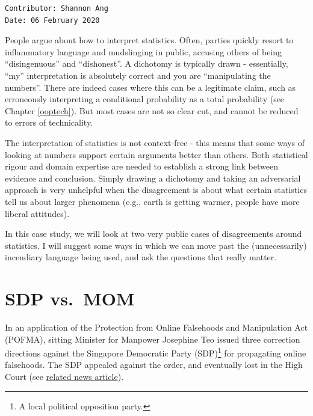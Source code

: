 \documentclass[
  openany]{book}
\begin{document}
\begin{verbatim}
Contributor: Shannon Ang
Date: 06 February 2020
\end{verbatim}

People argue about how to interpret statistics. Often, parties quickly resort to inflammatory language and mudslinging in public, accusing others of being ``disingenuous'' and ``dishonest''. A dichotomy is typically drawn - essentially, ``my'' interpretation is absolutely correct and you are ``manipulating the numbers''. There are indeed cases where this can be a legitimate claim, such as erroneously interpreting a conditional probability as a total probability (see Chapter \ref{ooptech}). But most cases are not so clear cut, and cannot be reduced to errors of technicality.

The interpretation of statistics is not context-free - this means that some ways of looking at numbers support certain arguments better than others. Both statistical rigour and domain expertise are needed to establish a strong link between evidence and conclusion. Simply drawing a dichotomy and taking an adversarial approach is very unhelpful when the disagreement is about what certain statistics tell us about larger phenomena (e.g., earth is getting warmer, people have more liberal attitudes).

In this case study, we will look at two very public cases of disagreements around statistics. I will suggest some ways in which we can move past the (unnecessarily) incendiary language being used, and ask the questions that really matter.

\hypertarget{pofmasdp}{%
\section{SDP vs.~MOM}\label{pofmasdp}}

In an application of the Protection from Online Falsehoods and Manipulation Act (POFMA), sitting Minister for Manpower Josephine Teo issued three correction directions against the Singapore Democratic Party (SDP)\footnote{A local political opposition party.} for propagating online falsehoods. The SDP appealed against the order, and eventually lost in the High Court (see \href{https://www.channelnewsasia.com/news/singapore/judge-dismisses-sdp-s-pofma-challenge-says-statements-were-false-12394932}{related news article}).
\end{document}
